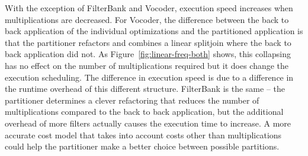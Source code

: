 With the exception of FilterBank and Vocoder, execution speed
increases when multiplications are decreased. For Vocoder, the
difference between the back to back application of the individual
optimizations and the partitioned application is that the partitioner
refactors and combines a linear splitjoin where the back to back
application did not. As Figure~\ref{fig:linear-freq-both} shows, this
collapsing has no effect on the number of multiplications required but
it does change the execution scheduling.  The difference in execution
speed is due to a difference in the runtime overhead of this different
structure. FilterBank is the same -- the partitioner determines a
clever refactoring that reduces the number of multiplications compared
to the back to back application, but the additional overhead of more
filters actually causes the execution time to increase. A more
accurate cost model that takes into account costs other than
multiplications could help the partitioner make a better choice
between possible partitions.

